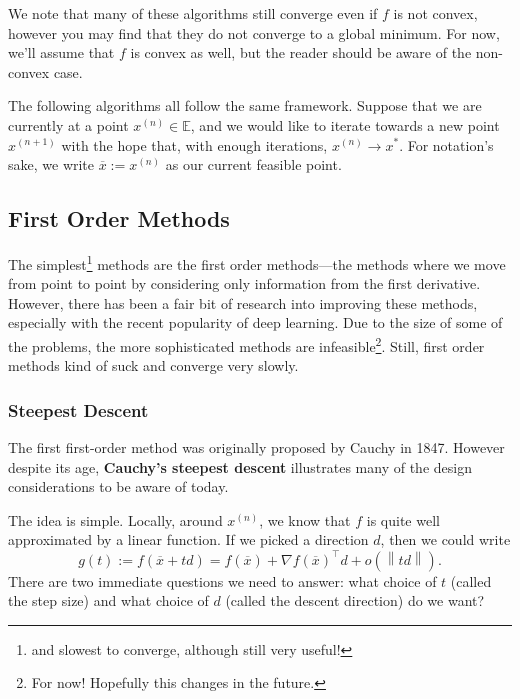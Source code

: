 \documentclass[11pt]{article}
\numberwithin{equation}{section}
\theoremstyle{definition}
\newcommand{\bE}{\mathbb{E}}
\newcommand{\norm}[1]{\left\lVert#1\right\rVert}
\newcommand{\ox}{\overline{x}}
\begin{document}
We note that many of these algorithms still converge even if $f$ is not convex, however you may find that they do not converge to a global minimum. For now, we'll assume that $f$ is convex as well, but the reader should be aware of the non-convex case.

The following algorithms all follow the same framework. Suppose that we are currently at a point $x^{(n)}\in\bE$, and we would like to iterate towards a new point $x^{(n+1)}$ with the hope that, with enough iterations, $x^{(n)}\to x^*$. For notation's sake, we write $\overline x:=x^{(n)}$ as our current feasible point.
\subsection{First Order Methods}
The simplest\footnote{and slowest to converge, although still very useful!} methods are the first order methods---the methods where we move from point to point by considering only information from the first derivative. However, there has been a fair bit of research into improving these methods, especially with the recent popularity of deep learning. Due to the size of some of the problems, the more sophisticated methods are infeasible\footnote{For now! Hopefully this changes in the future.}. Still, first order methods kind of suck and converge very slowly.
\subsubsection{Steepest Descent}
The first first-order method was originally proposed by Cauchy in 1847. However despite its age, \textbf{Cauchy's steepest descent} illustrates many of the design considerations to be aware of today. 

The idea is simple. Locally, around $x^{(n)}$, we know that $f$ is quite well approximated by a linear function. If we picked a direction $d$, then we could write
\begin{equation}
    g(t):=f(\ox+td)=f(\ox)+\nabla f(\ox)^\top d+o(\norm{td}).
\end{equation}
There are two immediate questions we need to answer: what choice of $t$ (called the step size) and what choice of $d$ (called the descent direction) do we want?
\end{document}
